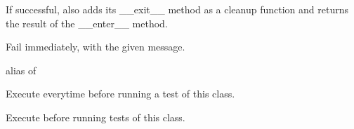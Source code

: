 \documentclass[letterpaper,10pt,english]{sphinxmanual}
\begin{document}
\begin{fulllineitems}
\begin{fulllineitems}
\sphinxAtStartPar
If successful, also adds its \_\_exit\_\_ method as a cleanup
function and returns the result of the \_\_enter\_\_ method.

\end{fulllineitems}


\begin{fulllineitems}
\label{\detokenize{_autosummary/tests.test_unit.test_df:tests.test_unit.test_df.fail}}
\pysigstartsignatures
{}
\pysigstopsignatures
\sphinxAtStartPar
Fail immediately, with the given message.

\end{fulllineitems}


\begin{fulllineitems}
\label{\detokenize{_autosummary/tests.test_unit.test_df:tests.test_unit.test_df.failureException}}
\pysigstartsignatures
{}
\pysigstopsignatures
\sphinxAtStartPar
alias of 

\end{fulllineitems}


\begin{fulllineitems}
\label{\detokenize{_autosummary/tests.test_unit.test_df:tests.test_unit.test_df.setUp}}
\pysigstartsignatures
{}
\pysigstopsignatures
\sphinxAtStartPar
Execute everytime before running a test of this class.

\end{fulllineitems}


\begin{fulllineitems}
\label{\detokenize{_autosummary/tests.test_unit.test_df:tests.test_unit.test_df.setUpClass}}
\pysigstartsignatures
{}
\pysigstopsignatures
\sphinxAtStartPar
Execute before running tests of this class.


\end{fulllineitems}
\end{fulllineitems}
\end{document}
